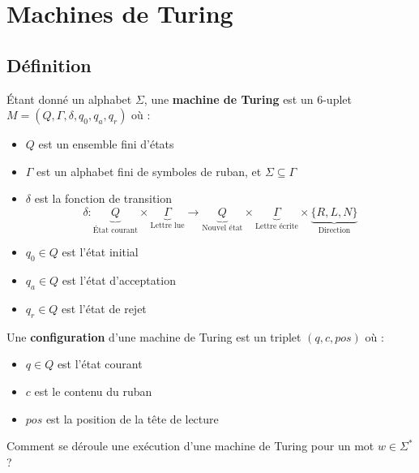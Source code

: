 \section{Machines de Turing}

\subsection{Définition}

\begin{definition}
	Étant donné un alphabet $\Sigma$, une \textbf{machine de Turing} est un 6-uplet $M = (Q, \Gamma, \delta, q_0, q_a, q_r)$ où :
	\begin{itemize}
		\item $Q$ est un ensemble fini d'états
		\item $\Gamma$ est un alphabet fini de symboles de ruban, et $\Sigma \subseteq \Gamma$
		\item $\delta$ est la fonction de transition
		      $$ \delta: \underbrace{Q}_{\text{État courant}} \times \underbrace{\Gamma}_{\text{Lettre lue}} \to \underbrace{Q}_{\text{Nouvel état}} \times
			      \underbrace{\Gamma}_{\text{Lettre écrite}} \times \underbrace{\{R, L, N\}}_{\text{Direction}} $$
		\item $q_0 \in Q$ est l'état initial
		\item $q_a \in Q$ est l'état d'acceptation
		\item $q_r \in Q$ est l'état de rejet
	\end{itemize}
\end{definition}

\begin{definition}[Configuration]
	Une \textbf{configuration} d'une machine de Turing est un triplet $(q, c, pos)$ où :
	\begin{itemize}
		\item $q \in Q$ est l'état courant
		\item $c$ est le contenu du ruban
		\item $pos$ est la position de la tête de lecture
	\end{itemize}
\end{definition}

Comment se déroule une exécution d'une machine de Turing pour un mot $w \in \Sigma^*$ ?

